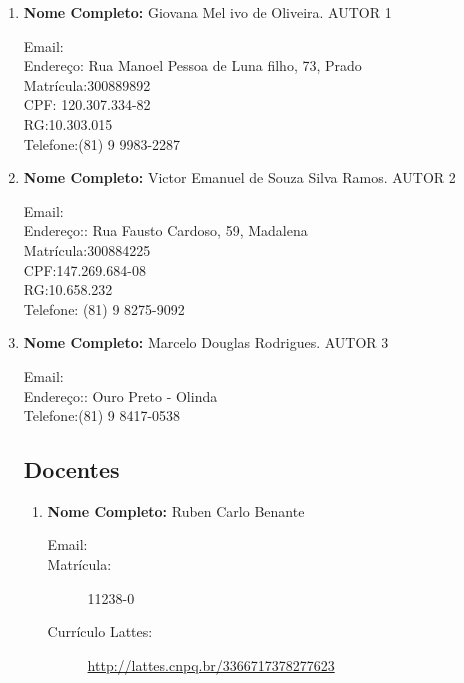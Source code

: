 \documentclass[a4paper,12pt]{article} %
\begin{document}
\begin{enumerate}
    \item \textbf{Nome Completo:} Giovana Mel ivo de Oliveira. AUTOR 1
    \begin{description}
        \item [Email:] 
        \item [Endereço: Rua Manoel Pessoa de Luna filho, 73, Prado]
        \item [Matrícula:300889892]
        \item [CPF: 120.307.334-82]
        \item [RG:10.303.015]
        \item [Telefone:(81) 9 9983-2287]
        \end{description}

    \item \textbf{Nome Completo:} Victor Emanuel de Souza Silva Ramos. AUTOR 2
        \begin{description}
        \item [Email:] 
        \item [Endereço:: Rua Fausto Cardoso, 59, Madalena]
        \item [Matrícula:300884225]
        \item [CPF:147.269.684-08]
        \item [RG:10.658.232]
        \item [Telefone: (81) 9 8275-9092]
        \end{description}

    \item \textbf{Nome Completo:} Marcelo Douglas Rodrigues. AUTOR 3
        \begin{description}
        \item [Email:] 
        \item [Endereço:: Ouro Preto - Olinda]
        \item [Telefone:(81) 9 8417-0538]
        \end{description}

\subsection*{Docentes}

\begin{enumerate}
    \item \textbf{Nome Completo:} Ruben Carlo Benante
    \begin{description}
        \item [Email:] 
        \item [Matrícula:] 11238-0
        \item [Currículo Lattes:] \url{http://lattes.cnpq.br/3366717378277623}
    \end{description}
\end{enumerate}



\end{enumerate}
\end{document}
